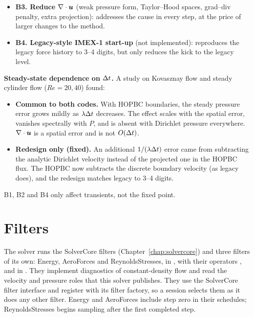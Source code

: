 \begin{itemize}
\begin{itemize}
    rebuild its histories, checkpoint output of extra fields
    (, \dots) with metadata, and a restart reader with a
    fallback to the start-up.
    \item \textbf{Constraints.} Exact restarts are bit-exact on CPU only
    (Device reductions are not deterministic). Checkpoints grow by
    $1+(J-1)d/(d+1)$, e.g.\ $+67\%$ in 2D at order 2.
  \end{itemize}
  \item \textbf{B3. Reduce $\nabla\cdot\boldsymbol{u}$} (weak pressure form,
  Taylor--Hood spaces, grad--div penalty, extra projection): addresses the
  cause in every step, at the price of larger changes to the method.
  \item \textbf{B4. Legacy-style IMEX-1 start-up} (not implemented):
  reproduces the legacy force history to 3--4 digits, but only reduces the
  kick to the legacy level.
\end{itemize}

\textbf{Steady-state dependence on $\Delta t$.} A study on Kovasznay flow and
steady cylinder flow ($Re=20,40$) found:
\begin{itemize}
  \item \textbf{Common to both codes.} With HOPBC boundaries, the steady
  pressure error grows mildly as $\lambda\Delta t$ decreases. The effect
  scales with the spatial error, vanishes spectrally with $P$, and is absent
  with Dirichlet pressure everywhere. $\nabla\cdot\boldsymbol{u}$ is a spatial
  error and is not $O(\Delta t)$.
  \item \textbf{Redesign only (fixed).} An additional $1/(\lambda\Delta t)$
  error came from subtracting the analytic Dirichlet velocity instead of the
  projected one in the HOPBC flux. The HOPBC now subtracts the discrete
  boundary velocity (as legacy  does), and the redesign matches
  legacy to 3--4 digits.
\end{itemize}
B1, B2 and B4 only affect transients, not the fixed point.

\section{Filters}
\label{sec:incns-filters}

The solver runs the SolverCore filters (Chapter~\ref{chap:solvercore}) and
three filters of its own: Energy, AeroForces and ReynoldsStresses, in
, with their operators ,  and
 in . They implement diagnostics of
constant-density flow and read the velocity and pressure roles that this
solver publishes. They use the SolverCore filter interface and register with
its filter factory, so a session selects them as it does any other filter.
Energy and AeroForces include step zero in their schedules; ReynoldsStresses
begins sampling after the first completed step.

